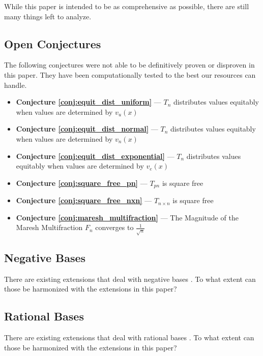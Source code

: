 \documentclass[conference]{IEEEtran}
\begin{document}
While this paper is intended to be as comprehensive as possible, there are still many things left to analyze. 

\subsection{Open Conjectures}

The following conjectures were not able to be definitively proven or disproven in this paper. They have been computationally tested to the best our resources can handle.

\begin{itemize}
    \item \textbf{Conjecture \ref{conj:equit_dist_uniform}} --- $T_n$ distributes values equitably when values are determined by $v_u(x)$
    \item \textbf{Conjecture \ref{conj:equit_dist_normal}} --- $T_n$ distributes values equitably when values are determined by $v_n(x)$
    \item \textbf{Conjecture \ref{conj:equit_dist_exponential}} --- $T_n$ distributes values equitably when values are determined by $v_e(x)$
    \item \textbf{Conjecture \ref{conj:square_free_pn}} --- $T_{pn}$ is square free
    \item \textbf{Conjecture \ref{conj:square_free_nxn}} --- $T_{n \times n}$ is square free
    \item \textbf{Conjecture \ref{conj:maresh_multifraction}} --- The Magnitude of the Maresh Multifraction $F_n$ converges to $\tfrac{1}{\sqrt{n}}$
\end{itemize}

\subsection{Negative Bases}

There are existing extensions that deal with negative bases \cite{OEIS-TMS-negabinary}. To what extent can those be harmonized with the extensions in this paper?

\subsection{Rational Bases}

There are existing extensions that deal with rational bases \cite{OEIS-TMS-3-2}. To what extent can those be harmonized with the extensions in this paper?
\end{document}
